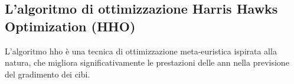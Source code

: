 \subsection{L'algoritmo di ottimizzazione Harris Hawks Optimization (HHO)}
\noindent

L'algoritmo \gls{hho} è una tecnica di ottimizzazione meta-euristica ispirata alla natura, che migliora significativamente le prestazioni delle \gls{ann} nella previsione del gradimento dei cibi. 

